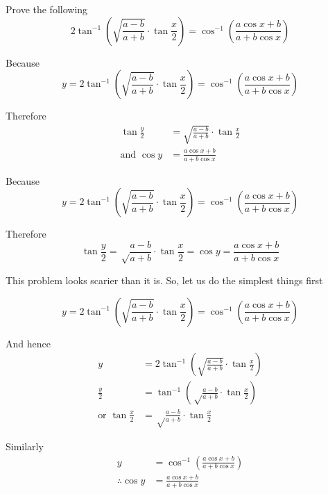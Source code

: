 \documentclass[14pt,fleqn]{extarticle}
\newcommand\ea{\frac{a-b}{a+b}}
\begin{document}
\begin{problem}
	\statement 
    
     Prove the following 
     \small\[ 2\tan^{-1} \left(\sqrt{\ea}\cdot\tan \frac{x}{2} \right) = \cos^{-1} \left(\frac{a\cos x + b}{a + b\cos x} \right)\] \normalsize
     
     \begin{step}
  \begin{options} 
     \correct 
       
       Because 
       \small\[ y = 2\tan^{-1} \left(\sqrt{\ea}\cdot\tan \frac{x}{2} \right) = \cos^{-1} \left(\frac{a\cos x + b}{a + b\cos x} \right)\] \normalsize
       
       Therefore 
       \begin{align}
	\tan \frac{y}{2} &= \sqrt{\ea}\cdot\tan \frac{x}{2} \\
	\text{and } \cos y &= \frac{a\cos x + b}{a + b\cos x}
\end{align}

\incorrect
 
Because 
       \small\[ y = 2\tan^{-1} \left(\sqrt{\ea}\cdot\tan \frac{x}{2} \right) = \cos^{-1} \left(\frac{a\cos x + b}{a + b\cos x} \right)\] \normalsize

Therefore 
\[ \tan \frac{y}{2} = \sqrt\ea\cdot\tan \frac{x}{2} = \cos y = \frac{a\cos x + b}{a + b\cos x}\]       
        
    \end{options} 
     \reason 
     
     This problem looks scarier than it is. So, let us do the simplest things first 
     
     \small\[ y = 2\tan^{-1} \left(\sqrt{\ea}\cdot\tan \frac{x}{2} \right) = \cos^{-1} \left(\frac{a\cos x + b}{a + b\cos x} \right)\] \normalsize
     
     And hence 
     \begin{align}
     y &= 2\tan^{-1} \left(\sqrt{\ea}\cdot\tan \frac{x}{2} \right) \\
     \frac{y}{2} &= \tan^{-1} \left(\sqrt\ea\cdot\tan \frac{x}{2} \right) \\
     \text{or } \tan \frac{x}{2} &= \sqrt\ea\cdot\tan\frac{x}{2}
\end{align}

Similarly 
\begin{align}
y &= \cos^{-1} \left( \frac{a\cos x + b}{a + b\cos x}\right) \\
	\therefore \cos y &= \frac{a\cos x + b}{a + b\cos x}
\end{align}
       

\end{step}
\end{problem}
\end{document}
